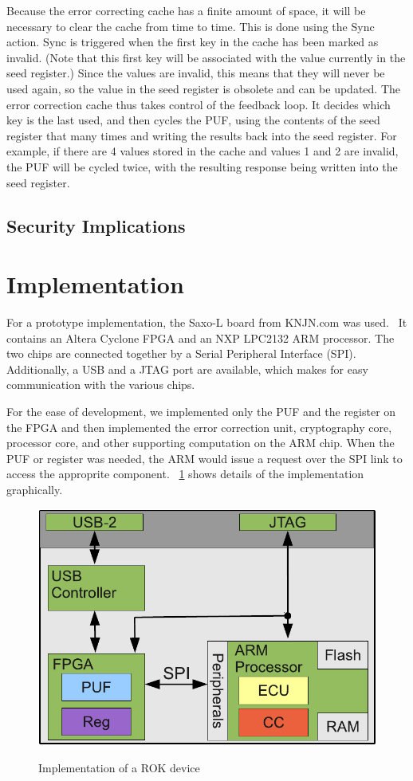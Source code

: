 Because the error correcting cache has a finite amount of space, it will be necessary to clear the cache from time to
time. This is done using the Sync action. Sync is triggered when the first key in the cache has been marked as invalid.
(Note that this first key will be associated with the value currently in the seed register.) Since the values are invalid,
this means that they will never be used again, so the value in the seed register is obsolete and can be updated.
The error correction cache thus takes control of the feedback loop. It decides which key is the last used, and then cycles
the PUF, using the contents of the seed register that many times and writing the results back into the seed register.
For example, if there are 4 values stored in the cache and values 1 and 2 are invalid, the PUF will be cycled twice,
with the resulting response being written into the seed register.

\subsection{Security Implications}

\section{Implementation}
For a prototype implementation, the Saxo-L board from KNJN.com was used.~\cite{KNJN} It contains an Altera
Cyclone FPGA and an NXP LPC2132 ARM processor. The two chips are connected together by a Serial Peripheral
Interface (SPI). Additionally, a USB and a JTAG port are available, which makes for easy communication with the
various chips.

For the ease of development, we implemented only the PUF and the register on the FPGA and then implemented
the error correction unit, cryptography core, processor core, and other supporting computation on the ARM chip. 
When the PUF or register was needed, the ARM would issue a request over the SPI link to access the approprite component.
~\ref{fig:rokimpl} shows details of the implementation graphically.

\begin{figure}[!ht]
\includegraphics[width=500px]{images/rok.pdf}
\label{fig:rokimpl}
\caption{Implementation of a ROK device}
\end{figure}
\FloatBarrier

